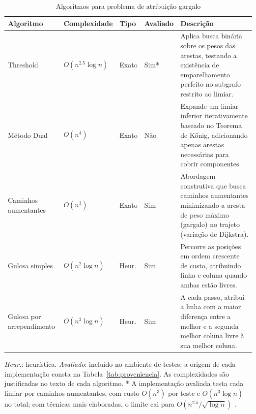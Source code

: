 \begin{table}[H]
    \centering
    \caption{Algoritmos para problema de atribuição gargalo}
    \label{tab:atribuicao_gargalo_algos}
    \renewcommand{\arraystretch}{1.2} %
    \footnotesize
    
    \begin{tabularx}{\textwidth}{@{} >{\raggedright\arraybackslash}p{2.8cm} l l l >{\raggedright\arraybackslash}X @{}}
        \toprule
        \textbf{Algoritmo} & \textbf{Complexidade} & \textbf{Tipo} & \textbf{Avaliado} & \textbf{Descrição} \\
        \midrule
        
        Threshold & $O(n^{2.5} \log n)$ & Exato & Sim* & 
        Aplica busca binária sobre os pesos das arestas, testando a existência de emparelhamento perfeito no subgrafo restrito ao limiar. \\
        \addlinespace 
        
        Método Dual & $O(n^4)$ & Exato & Não & 
        Expande um limiar inferior iterativamente baseado no Teorema de Kőnig, adicionando apenas arestas necessárias para cobrir componentes. \\
        \addlinespace
        
        Caminhos aumentantes & $O(n^3)$ & Exato & Sim & 
        Abordagem construtiva que busca caminhos aumentantes minimizando a aresta de peso máximo (gargalo) no trajeto (variação de Dijkstra). \\
        \addlinespace
        
        Gulosa simples & $O(n^2 \log n)$ & Heur. & Sim & 
        Percorre as posições em ordem crescente de custo, atribuindo linha e coluna quando ambas estão livres. \\
        \addlinespace
        
        Gulosa por arrependimento & $O(n^2 \log n)$ & Heur. & Sim & 
        A cada passo, atribui a linha com a maior diferença entre a melhor e a segunda melhor coluna livre à sua melhor coluna. \\
        
        \bottomrule
    \end{tabularx}
    \par\smallskip
    {\raggedright\footnotesize \textit{Heur.}: heurística. \textit{Avaliado}: incluído no ambiente de testes; a origem de cada implementação consta na Tabela~\ref{tab:proveniencia}. As complexidades são justificadas no texto de cada algoritmo. * A implementação avaliada testa cada limiar por caminhos aumentantes, com custo $O(n^3)$ por teste e $O(n^3 \log n)$ no total; com técnicas mais elaboradas, o limite cai para $O(n^{2.5}/\sqrt{\log n})$ \cite{burkard}.\par}
\end{table}